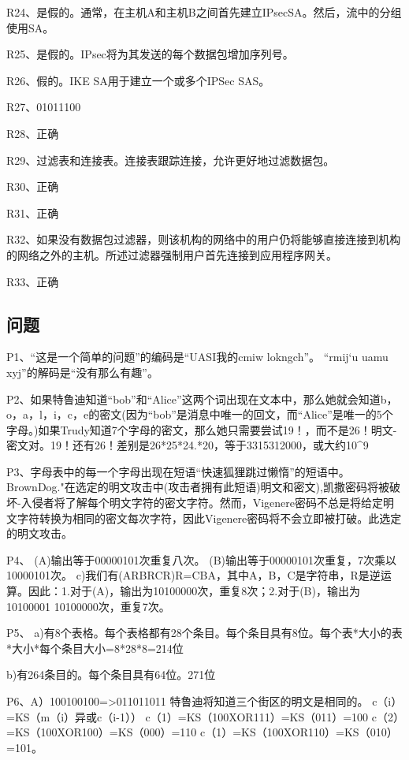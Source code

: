 \documentclass[11pt,UTF8,twoside]{article}
\begin{document}
{		R24、是假的。通常，在主机A和主机B之间首先建立IPsecSA。然后，流中的分组使用SA。
		
		R25、是假的。IPsec将为其发送的每个数据包增加序列号。
		
		R26、假的。IKE SA用于建立一个或多个IPSec SAS。
		
		R27、01011100
		
		R28、正确
		
		R29、过滤表和连接表。连接表跟踪连接，允许更好地过滤数据包。
		
		R30、正确
		
		R31、正确
		
		R32、如果没有数据包过滤器，则该机构的网络中的用户仍将能够直接连接到机构的网络之外的主机。所述过滤器强制用户首先连接到应用程序网关。
		
		R33、正确
		
		\subsection{问题}
		
		P1、“这是一个简单的问题”的编码是“UASI我的cmiw lokngch”。
		“rmij‘u uamu xyj”的解码是“没有那么有趣”。
		
		P2、如果特鲁迪知道“bob”和“Alice”这两个词出现在文本中，那么她就会知道b，o，a，l，i，c，e的密文(因为“bob”是消息中唯一的回文，而“Alice”是唯一的5个字母。)如果Trudy知道7个字母的密文，那么她只需要尝试19！，而不是26！明文-密文对。19！还有26！差别是26*25*24.*20，等于3315312000，或大约10^9
		
		P3、字母表中的每一个字母出现在短语“快速狐狸跳过懒惰”的短语中。BrownDog."在选定的明文攻击中(攻击者拥有此短语)明文和密文),凯撒密码将被破坏-入侵者将了解每个明文字符的密文字符。然而，Vigenere密码不总是将给定明文字符转换为相同的密文每次字符，因此Vigenere密码将不会立即被打破。此选定的明文攻击。
		
		P4、
		(A)输出等于00000101次重复八次。
		(B)输出等于00000101次重复，7次乘以10000101次。
		c)我们有(ARBRCR)R=CBA，其中A，B，C是字符串，R是逆运算。因此：1.对于(A)，输出为10100000次，重复8次；2.对于(B)，输出为10100001 10100000次，重复7次。
		
		P5、
		a)有8个表格。每个表格都有28个条目。每个条目具有8位。每个表*大小的表*大小*每个条目大小=8*28*8=214位
		
		b)有264条目的。每个条目具有64位。271位
		
		P6、A）100100100=>011011011 特鲁迪将知道三个街区的明文是相同的。 c（i）=KS（m（i）异或c（i-1）） c（1）=KS（100XOR111）=KS（011）=100 c（2）=KS（100XOR100）=KS（000）=110 c（1）=KS（100XOR110）=KS（010）=101。
		
}
\end{document}
